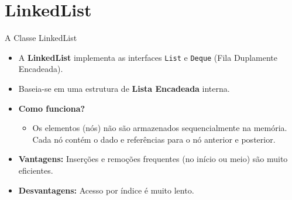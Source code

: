 \documentclass[9pt]{beamer}
\begin{document}
\section{LinkedList}

\begin{frame}{A Classe LinkedList}
    \begin{itemize}
        \item A \textbf{LinkedList} implementa as interfaces \texttt{List} e \texttt{Deque} (Fila Duplamente Encadeada).
        \item Baseia-se em uma estrutura de \textbf{Lista Encadeada} interna.
        \item \textbf{Como funciona?}
        \begin{itemize}
            \item Os elementos (nós) não são armazenados sequencialmente na memória. Cada nó contém o dado e referências para o nó anterior e posterior.
        \end{itemize}
        \item \textbf{Vantagens:} Inserções e remoções frequentes (no início ou meio) são muito eficientes.
        \item \textbf{Desvantagens:} Acesso por índice é muito lento.
    \end{itemize}
\end{frame}
\end{document}

